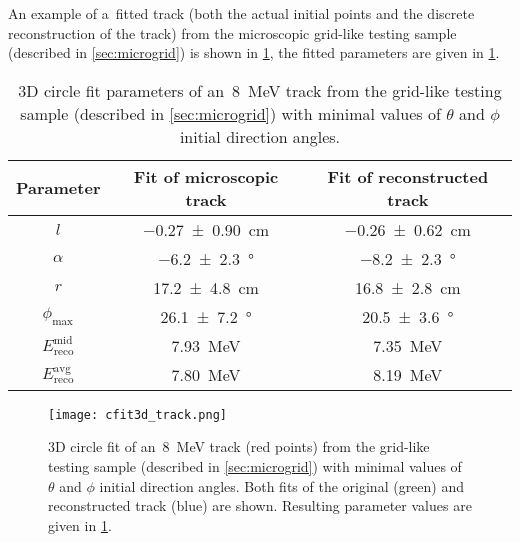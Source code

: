 			An example of a~fitted track (both the actual initial points and the discrete reconstruction of the track) from the microscopic grid-like testing sample (described in \cref{sec:microgrid}) is shown in \cref{fig:cfit3d}, the fitted parameters are given in \cref{tab:cfit3d}.
			
			
			\begin{table}
				\centering
				{\renewcommand{\arraystretch}{1.2}
					\begin{tabular}{|c|c|c|}
						\hline
						\textbf{Parameter} & \textbf{Fit of microscopic track} & \textbf{Fit of reconstructed track} \\
						\hline
						$l$ & \qty{-0.27 \pm 0.90}{\cm} & \qty{-0.26 \pm 0.62}{\cm} \\ \hline
						$\alpha$ & \qty{-6.2 \pm 2.3}{\degree} & \qty{-8.2 \pm 2.3}{\degree} \\ \hline
						$r$ & \qty{17.2 \pm 4.8}{\cm} & \qty{16.8 \pm 2.8}{\cm} \\ \hline
						$\phi_{\text{max}}$ & \qty{26.1 \pm 7.2}{\degree} & \qty{20.5 \pm 3.6}{\degree} \\ \hline
						$E_{\text{reco}}^{\text{mid}}$ & \qty{7.93}{\MeV} & \qty{7.35}{\MeV} \\ \hline
						$E_{\text{reco}}^{\text{avg}}$ & \qty{7.80}{\MeV} & \qty{8.19}{\MeV} \\ \hline
				\end{tabular}}
				\caption{3D circle fit parameters of an~\qty{8}{\MeV} track from the grid-like testing sample (described in \cref{sec:microgrid}) with minimal values of $\theta$ and $\phi$ initial direction angles.}
				\label{tab:cfit3d}
			\end{table}
			
			\begin{figure}
				\centering
				\texttt{[image: cfit3d\_track.png]}
				\caption{3D circle fit of an~\qty{8}{\MeV} track (red points) from the grid-like testing sample (described in \cref{sec:microgrid}) with minimal values of $\theta$ and $\phi$ initial direction angles. Both fits of the original (green) and reconstructed track (blue) are shown. Resulting parameter values are given in \cref{tab:cfit3d}.}
				\label{fig:cfit3d}
			\end{figure}			
			
